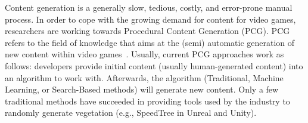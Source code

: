 

Content generation is a generally slow, tedious, costly, and error-prone manual process. In order to cope with the growing demand for content for video games, researchers are working towards Procedural Content Generation (PCG). PCG refers to the field of knowledge that aims at the (semi) automatic generation of new content within video games~\cite{hendrikx2013procedural}. Usually, current PCG approaches work as follows: developers provide initial content (usually human-generated content) into an algorithm to work with. Afterwards, the algorithm (Traditional, Machine Learning, or Search-Based methods) will generate new content. Only a few traditional methods have succeeded in providing tools used by the industry to randomly generate vegetation (e.g., SpeedTree in Unreal and Unity).

